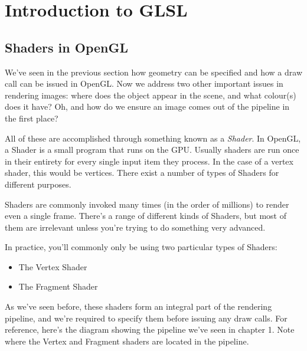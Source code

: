 \chapter{Introduction to GLSL}

\section{Shaders in OpenGL}

We've seen in the previous section how geometry can be specified and how a draw call can be issued in OpenGL. Now we address two other important issues in rendering images: where does the object appear in the scene, and what colour(s) does it have? Oh, and how do we ensure an image comes out of the pipeline in the first place?

All of these are accomplished through something known as a \emph{Shader}. In OpenGL, a Shader is a small program that runs on the GPU. Usually shaders are run once in their entirety for every single input item they process. In the case of a vertex shader, this would be vertices. There exist a number of types of Shaders for different purposes. 

Shaders are commonly invoked many times (in the order of millions) to render even a single frame. There's a range of different kinds of Shaders, but most of them are irrelevant unless you're trying to do something very advanced.

In practice, you'll commonly only be using two particular types of Shaders:

\begin{itemize}
  \item The Vertex Shader
  \item The Fragment Shader
\end{itemize}

As we've seen before, these shaders form an integral part of the rendering pipeline, and we're required to specify them before issuing any draw calls. For reference, here's the diagram showing the pipeline we've seen in chapter 1. Note where the Vertex and Fragment shaders are located in the pipeline.

